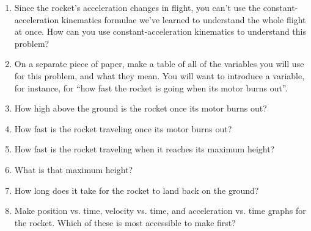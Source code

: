 \documentclass[12pt]{article}
\newcommand{\vs}[1]{\vspace{#1}}
\begin{document}
\begin{enumerate}
\item
Since the rocket's acceleration changes in flight, you can't use the constant-acceleration kinematics
formulae we've learned to understand the whole flight at once. How can you use constant-acceleration
kinematics to understand this problem?

\item On a separate piece of paper, make a table of all of the variables you will
use for this problem, and what they mean. You will want to introduce a variable, for 
instance, for ``how fast the rocket is going when its motor burns out''. 

\item
How high above the ground is the rocket once its motor burns out?

\vs{2in}

\item
How fast is the rocket traveling once its motor burns out?

\vs{2in}

\item
How fast is the rocket traveling when it reaches its maximum height?

\vs{2in}

\item What is that maximum height?

\vs{2in}

\item How long does it take for the rocket to land back on the ground?

\vs{2in}

\item Make position vs. time, velocity vs. time, and acceleration vs. time
graphs for the rocket. Which of these is most accessible to make first?
\end{enumerate}
\end{document}
